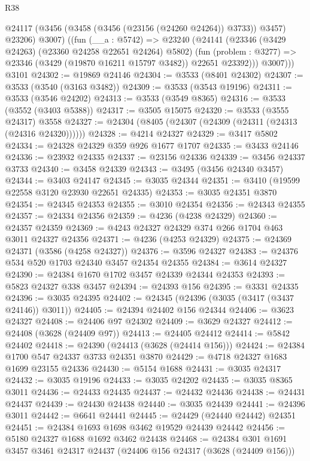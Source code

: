 \begin{lexlean}{R38}
\begin{coremodule}
        @24117 (@3456 (@3458 (@3456 (@23156 (@24260 @24264)) @3733)) @3457) @23206)
          @3007)
        ((fun (__a : @5742) =>
        @23240
          (@24141
            (@23346 (@3429 @24263) (@23360 @24258 @22651 @24264) @5802)
            (fun (problem : @3277) => @23346 (@3429 (@19870 @16211 @15797 @3482)) @22651 @23392)))
          @3007)))
    @3101
@24302 := @19869 @24146
@24304 := @3533 (@8401 @24302)
@24307 := @3533 (@3540 (@3163 @3482))
@24309 := @3533 (@3543 @19196)
@24311 := @3533 (@3546 @24202)
@24313 := @3533 (@3549 @8365)
@24316 := @3533 (@3552 (@3403 @5388))
@24317 := @3505 @15075
@24320 := @3533 (@3555 @24317) @3558
@24327 := @24304 (@8405 (@24307 (@24309 (@24311 (@24313 (@24316 @24320))))))
@24328 := @4214 @24327
@24329 := @3417 @5802
@24334 := @24328 @24329 @359 @926 @1677 @1707
@24335 := @3433 @24146
@24336 := @23932 @24335
@24337 := @23156 @24336
@24339 := @3456 @24337 @3733
@24340 := @3458 @24339
@24343 := @3495 (@3456 @24340 @3457)
@24344 := @3403 @24147
@24345 := @3035 @24344
@24351 := @3410 (@19599 @22558 @3120 @23930 @22651 @24335)
@24353 := @3035 @24351 @3870
@24354 := @24345 @24353
@24355 := @3010 @24354
@24356 := @24343 @24355
@24357 := @24334 @24356
@24359 := @4236 (@4238 @24329)
@24360 := @24357 @24359
@24369 := @4243 @24327 @24329 @374 @266 @1704 @463 @3011 @24327 @24356
@24371 := @4236 (@4253 @24329)
@24375 := @24369 @24371 (@3586 (@4258 @24327))
@24376 := @3596 @24327
@24383 := @24376 @534 @520 @1703 @24340 @3457 @24354 @24355
@24384 := @3614 @24327
@24390 := @24384 @1670 @1702 @3457 @24339 @24344 @24353
@24393 := @5823 @24327 @338 @3457
@24394 := @24393 @156
@24395 := @3331 @24335
@24396 := @3035 @24395
@24402 := @24345 (@24396 (@3035 (@3417 (@3437 @24146)) @3011))
@24405 := @24394 @24402 @156 @24344
@24406 := @3623 @24327
@24408 := @24406 @97 @24302
@24409 := @3629 @24327
@24412 := @24408 (@3628 (@24409 @97))
@24413 := @24405 @24412
@24414 := @5842 @24402
@24418 := @24390 (@24413 (@3628 (@24414 @156)))
@24424 := @24384 @1700 @547 @24337 @3733 @24351 @3870
@24429 := @4718 @24327 @1683 @1699 @23155 @24336
@24430 := @5154 @1688
@24431 := @3035 @24317
@24432 := @3035 @19196
@24433 := @3035 @24202
@24435 := @3035 @8365 @3011
@24436 := @24433 @24435
@24437 := @24432 @24436
@24438 := @24431 @24437
@24439 := @24430 @24438
@24440 := @3035 @24439
@24441 := @24396 @3011
@24442 := @6641 @24441
@24445 := @24429 (@24440 @24442) @24351
@24451 := @24384 @1693 @1698 @3462 @19529 @24439 @24442
@24456 := @5180 @24327 @1688 @1692 @3462 @24438
@24468 := @24384 @301 @1691 @3457 @3461 @24317 @24437 (@24406 @156 @24317 (@3628 (@24409 @156)))

\end{coremodule}
\end{lexlean}
